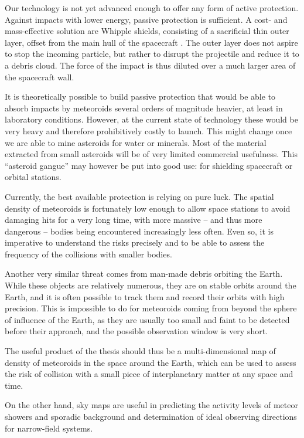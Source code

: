     Our technology is not yet advanced enough to offer any form of active protection.
    Against impacts with lower energy, passive protection is sufficient.
    A cost- and mass-effective solution are Whipple shields, consisting of a sacrificial thin outer layer,
    offset from the main hull of the spacecraft \citep{nasa-shield}.
    The outer layer does not aspire to stop the incoming particle,
    but rather to disrupt the projectile and reduce it to a debris cloud.
    The force of the impact is thus diluted over a much larger area of the spacecraft wall.

    It is theoretically possible to build passive protection that would be able to absorb impacts
    by meteoroids several orders of magnitude heavier, at least in laboratory conditions.
    However, at the current state of technology these would be very heavy and therefore prohibitively costly to launch.
    This might change once we are able to mine asteroids for water or minerals.
    Most of the material extracted from small asteroids will be of very limited commercial usefulness.
    This ``asteroid gangue'' may however be put into good use: for shielding spacecraft or orbital stations.

    Currently, the best available protection is relying on pure luck. The spatial density of meteoroids is
    fortunately low enough to allow space stations to avoid damaging hits for a very long time,
    with more massive -- and thus more dangerous -- bodies being encountered increasingly less often.
    Even so, it is imperative to understand the risks precisely and to be able to assess the frequency
    of the collisions with smaller bodies.

    Another very similar threat comes from man-made debris orbiting the Earth.
    While these objects are relatively numerous, they are on stable orbits around
    the Earth, and it is often possible to track them and record their orbits with high precision.
    This is impossible to do for meteoroids coming from beyond the sphere of influence of the Earth,
    as they are usually too small and faint to be detected before their approach, and the possible
    observation window is very short.

    The useful product of the thesis should thus be a multi-dimensional map of density
    of meteoroids in the space around the Earth, which can be used to assess the risk
    of collision with a small piece of interplanetary matter at any space and time.

    On the other hand, sky maps are useful in predicting the activity levels of
    meteor showers and sporadic background and determination of ideal observing
    directions for narrow-field systems.


